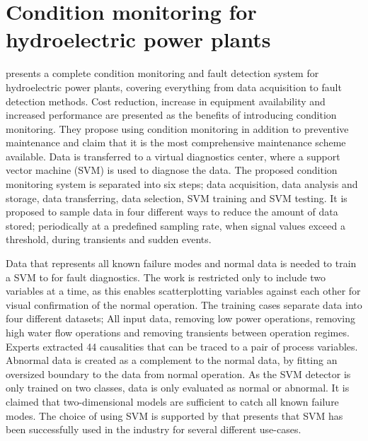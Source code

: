     \section{Condition monitoring for hydroelectric power plants}\label{sec:cm}
        \cite{Selak2014} presents a complete condition monitoring and fault detection system for hydroelectric power plants, covering everything from data acquisition to fault detection methods. Cost reduction, increase in equipment availability and increased performance are presented as the benefits of introducing condition monitoring. They propose using condition monitoring in addition to preventive maintenance and claim that it is the most comprehensive maintenance scheme available. Data is transferred to a virtual diagnostics center, where a support vector machine (SVM) is used to diagnose the data. The proposed condition monitoring system is separated into six steps; data acquisition, data analysis and storage, data transferring, data selection, SVM training and SVM testing. It is proposed to sample data in four different ways to reduce the amount of data stored; periodically at a predefined sampling rate, when signal values exceed a threshold, during transients and sudden events. 
        
        Data that represents all known failure modes and normal data is needed to train a SVM to for fault diagnostics. The work is restricted only to include two variables at a time, as this enables scatterplotting variables against each other for visual confirmation of the normal operation. The training cases separate data into four different datasets; All input data, removing low power operations, removing high water flow operations and removing transients between operation regimes. Experts extracted 44 causalities that can be traced to a pair of process variables. Abnormal data is created as a complement to the normal data, by fitting an oversized boundary to the data from normal operation. As the SVM detector is only trained on two classes, data is only evaluated as normal or abnormal. It is claimed that two-dimensional models are sufficient to catch all known failure modes. The choice of using SVM is supported by \cite{Widodo2007} that presents that SVM has been successfully used in the industry for several different use-cases. 
        
